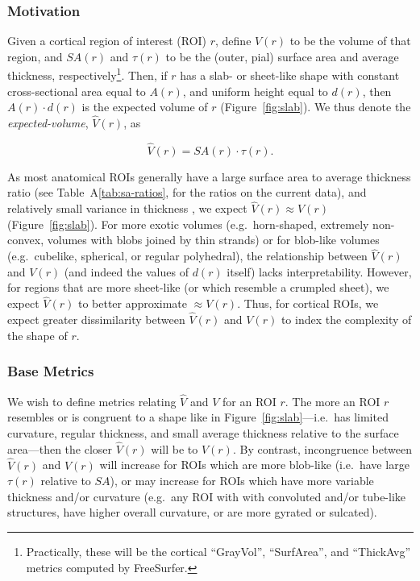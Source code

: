 \documentclass{article}
\begin{document}
\subsubsection{Motivation}

Given a cortical region of interest (ROI) \(r\), define \(V(r)\) to be the
volume of that region, and \(SA(r)\) and \(\tau(r)\) to be the (outer, pial)
surface area and average thickness, respectively\footnote{Practically, these
will be the cortical ``GrayVol'', ``SurfArea'', and ``ThickAvg'' metrics
computed by FreeSurfer.}. Then, if \(r\) has a slab- or sheet-like shape with
constant cross-sectional area equal to \(A(r)\), and uniform height equal to
\(d(r)\), then \(A(r) \cdot d(r)\) is the expected volume of \(r\)
(Figure~\ref{fig:slab}). We thus denote the \emph{expected-volume},
\(\hat{V}(r)\), as

\begin{equation}
\hat{V}(r) = SA(r) \cdot \tau(r).
\end{equation}

As most anatomical ROIs generally have a large surface area to average
thickness ratio (see Table~A\ref{tab:sa-ratios}, for the ratios on the
current data), and relatively small variance in thickness
\citep{imBrainSizeCortical2008}, we expect \(\hat{V}(r) \approx V(r)\)
(Figure~\ref{fig:slab}). For more exotic volumes (e.g.\ horn-shaped,
extremely non-convex, volumes with blobs joined by thin strands) or for
blob-like volumes (e.g.\ cubelike, spherical, or regular polyhedral), the
relationship between \(\hat{V}(r)\) and \(V(r)\) (and indeed the values of
\(d(r)\) itself) lacks interpretability. However, for regions that are more
sheet-like (or which resemble a crumpled sheet), we expect \(\hat{V}(r)\) to
better approximate \(\approx V(r)\). Thus, for cortical ROIs, we expect
greater dissimilarity between \(\hat{V}(r)\) and \(V(r)\) to index the
complexity of the shape of \(r\).

%

\subsubsection{Base Metrics}

We wish to define metrics relating \(\hat{V}\) and \(V\) for an ROI  \(r\).
The more an ROI \(r\) resembles or is congruent to a shape like in
Figure~\ref{fig:slab}---i.e.\ has limited curvature, regular thickness, and
small average thickness relative to the surface area---then the closer
\(\hat{V}(r)\) will be to \(V(r)\). By contrast, incongruence between
\(\hat{V}(r)\) and \(V(r)\) will increase for ROIs which are more blob-like
(i.e.\ have large \(\tau(r)\) relative to \(SA\)), or may increase for ROIs
which have more variable thickness and/or curvature (e.g.\ any ROI with with
convoluted and/or tube-like structures, have higher overall curvature, or are
more gyrated or sulcated).
\end{document}
